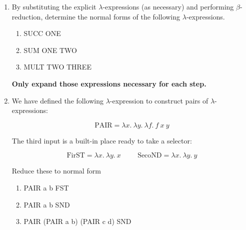 \documentclass[11pt]{report}
\begin{document}
\begin{enumerate}
	\item By substituting the explicit $\lambda$-expressions (as necessary) and performing $\beta$-reduction, determine the normal forms of the following $\lambda$-expressions. 

	\begin{enumerate}
		\item SUCC ONE
		\item SUM ONE TWO
		\item MULT TWO THREE
	\end{enumerate}

	{\bf Only expand those expressions necessary for each step.}

	\item We have defined the following $\lambda$-expression to construct pairs of $\lambda$-expressions:
	
	$$\text{PAIR} = \lambda x. \ \lambda y. \ \lambda f. \ f \ x \ y$$

	The third input is a built-in place ready to take a selector:

	$$\text{FirST} = \lambda x. \ \lambda y. \ x \hspace{1cm} \text{SecoND} = \lambda x. \ \lambda y. \ y$$

	 Reduce these to normal form 

		\begin{enumerate}
			\item PAIR a b FST \vspace{0.2cm}
			\item PAIR a b SND \vspace{0.2cm}
			\item PAIR (PAIR a b) (PAIR c d) SND
		\end{enumerate}

%
%	
%
%


\end{enumerate}
\end{document}
